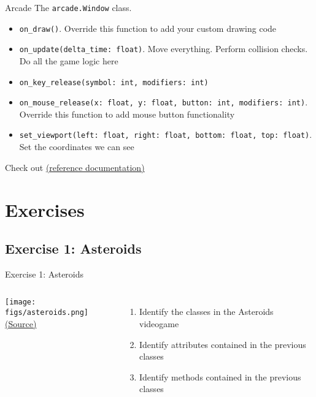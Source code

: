 \documentclass[10pt,compress]{beamer} %
\begin{document}
\begin{frame}{Arcade}
	The \texttt{arcade.Window} class.

	\begin{block}{}
		\vspace{-0.15cm}
		\begin{itemize}
		\item \footnotesize{\texttt{on\_draw()}}. Override this function to add your custom drawing code
		\item \footnotesize{\texttt{on\_update(delta\_time: float)}}. Move everything. Perform collision checks. Do all the game logic here
		\item \footnotesize{\texttt{on\_key\_release(symbol: int, modifiers: int)}} 
		\item \footnotesize{\texttt{on\_mouse\_release(x: float, y: float, button: int, modifiers: int)}}. Override this function to add mouse button functionality
		\item \footnotesize{\texttt{set\_viewport(left: float, right: float, bottom: float, top: float)}}. Set the coordinates we can see
		\end{itemize}
		\vspace{-0.2cm}
	\end{block}	

	Check out \href{https://arcade.academy/arcade.html\#arcade.Window}{(reference documentation)}
\end{frame}

\section{Exercises}
\subsection{Exercise 1: Asteroids}
	\begin{frame}{Exercise 1: Asteroids}
	\vspace{-0.3cm}
    \begin{columns}
		\centering \texttt{[image: figs/asteroids.png]}\\
		\tiny{\href{http://gamedevelopment.tutsplus.com/tutorials/quick-tip-intro-to-object-oriented-programming-for-game-development--gamedev-1805}{(Source)}}
	\begin{enumerate}
	\item Identify the classes in the Asteroids videogame
	\item Identify attributes contained in the previous classes
	\item Identify methods contained in the previous classes
	\end{enumerate}
	\end{columns}
\end{frame}
\end{document}
